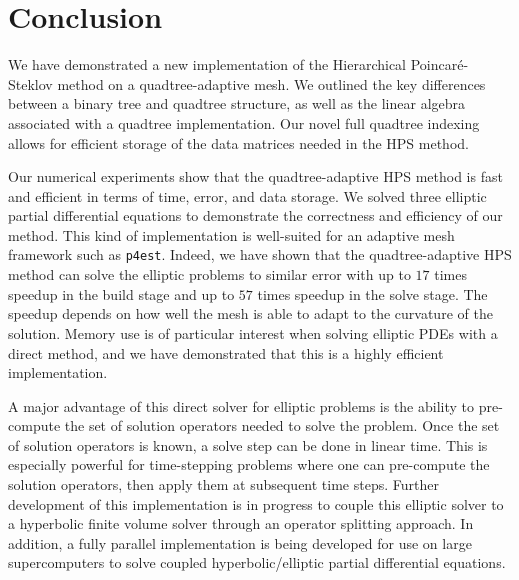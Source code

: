 \section{Conclusion}
\label{sec:conclusion}

We have demonstrated a new implementation of the Hierarchical Poincaré-Steklov method on a quadtree-adaptive mesh. We outlined the key differences between a binary tree and quadtree structure, as well as the linear algebra associated with a quadtree implementation. Our novel full quadtree indexing allows for efficient storage of the data matrices needed in the HPS method.

Our numerical experiments show that the quadtree-adaptive HPS method is fast and efficient in terms of time, error, and data storage. We solved three elliptic partial differential equations to demonstrate the correctness and efficiency of our method. This kind of implementation is well-suited for an adaptive mesh framework such as \texttt{p4est}. Indeed, we have shown that the quadtree-adaptive HPS method can solve the elliptic problems to similar error with up to $17$ times speedup in the build stage and up to $57$ times speedup in the solve stage. The speedup depends on how well the mesh is able to adapt to the curvature of the solution. Memory use is of particular interest when solving elliptic PDEs with a direct method, and we have demonstrated that this is a highly efficient implementation.

A major advantage of this direct solver for elliptic problems is the ability to pre-compute the set of solution operators needed to solve the problem. Once the set of solution operators is known, a solve step can be done in linear time. This is especially powerful for time-stepping problems where one can pre-compute the solution operators, then apply them at subsequent time steps. Further development of this implementation is in progress to couple this elliptic solver to a hyperbolic finite volume solver through an operator splitting approach. In addition, a fully parallel implementation is being developed for use on large supercomputers to solve coupled hyperbolic/elliptic partial differential equations.